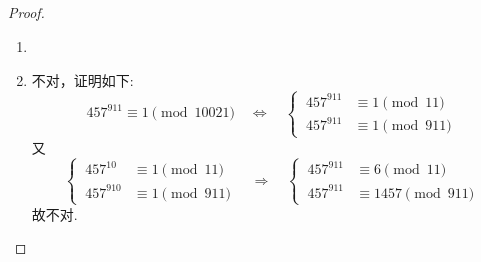 \documentclass[UTF8]{ctexart}
\begin{document}
\subsection{}   %
\begin{proof}
    \begin{enumerate}
        \item []
        \item []不对，证明如下:
        \[
            {457}^{911} \equiv 1 \pmod{10021}
            \quad \Leftrightarrow\quad
            \begin{cases}
                \ {457}^{911} & \equiv 1 \pmod{11}\\
                \ {457}^{911} & \equiv 1 \pmod{911}
            \end{cases}
        \]
        又
        \[
            \begin{cases}
                \ {457}^{10} & \equiv 1 \pmod{11}\\
                \ {457}^{910} & \equiv 1 \pmod{911}
            \end{cases}
            \quad \Rightarrow\quad
            \begin{cases}
                \ {457}^{911} & \equiv 6 \pmod{11}\\
                \ {457}^{911} & \equiv 1457 \pmod{911}
            \end{cases}
        \]
        故不对.
    \end{enumerate}
\end{proof}
\end{document}
